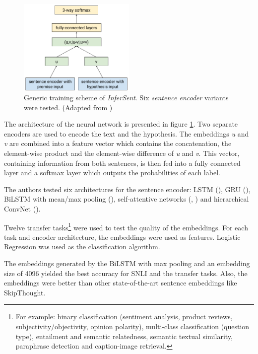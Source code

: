 \begin{figure}[ht]
\centering
	\includegraphics[width=0.5\textwidth,scale=0.5]{images/nli}
	\caption{Generic training scheme of \emph{InferSent}. Six \emph{sentence encoder} variants were tested.  (Adapted from \cite{Conneau:2017aa})}
		\label{fig:infersent}
\end{figure}


The architecture of the neural network is presented in figure \ref{fig:infersent}. Two separate encoders are used to encode the text and the hypothesis. The embeddings \emph{u} and \emph{v} are combined into a feature vector which contains the concatenation, the element-wise product and the element-wise difference of \emph{u} and \emph{v}. This vector, containing information from both sentences, is then fed into a fully connected layer and a softmax layer which outputs the probabilities of each label.

The authors tested six architectures for the sentence encoder: LSTM (\cite{hochreiter1997long}), GRU (\cite{cho2014properties}), BiLSTM with mean/max pooling (\cite{collobert2008unified}), self-attentive networks (\cite{liu2016learning}, \cite{lin2017structured}) and hierarchical ConvNet (\cite{zhao2015self}). 

Twelve transfer tasks\footnote{For example: binary classification (sentiment analysis, product reviews, subjectivity/objectivity, opinion polarity), multi-class classification (question type), entailment and semantic relatedness, semantic textual similarity, paraphrase detection and caption-image retrieval.} were used to test the quality of the embeddings. For each task and encoder architecture, the embeddings were used as features. Logistic Regression was used as the classification algorithm.

The embeddings generated by the BiLSTM with max pooling and an embedding size of 4096 yielded the best accuracy for SNLI and the transfer tasks. Also, the embeddings were better than other state-of-the-art sentence embeddings like SkipThought.

